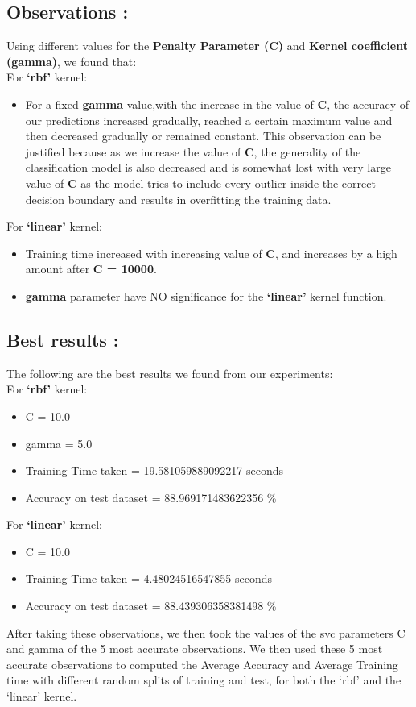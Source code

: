\documentclass{report}
\begin{document}
\subsection{\LARGE Observations :}
Using different values for the \textbf{Penalty Parameter (C)} and \textbf{Kernel coefficient (gamma)}, we found that:\\
\linebreak
\linebreak
{For \textbf{‘rbf’} kernel:}
\setlength{\itemsep}{0cm}
\begin{itemize}
\item For a fixed \textbf{gamma} value,with the increase in the value of \textbf{C}, the accuracy of our predictions increased gradually, reached a certain maximum value and then decreased gradually or remained constant. This observation can be justified because as we increase the value of \textbf{C}, the generality of the classification model is also decreased and is somewhat lost with very large value of \textbf{C} as the model tries to include every outlier inside the correct decision boundary and results in overfitting the training data.

\end{itemize}
For \textbf{‘linear’} kernel:
\begin{itemize}
\item Training time increased with increasing value of \textbf{C}, and increases by a high amount after \textbf{C = 10000}.
\item \textbf{gamma} parameter have NO significance for the \textbf{‘linear’} kernel function.
\end{itemize}
\subsection{\LARGE Best results :}
The following are the best results we found from our experiments:\\
\linebreak
For \textbf{‘rbf’} kernel:
\begin{itemize}
\item C = 10.0
\item gamma = 5.0
\item Training Time taken = 19.581059889092217 seconds
\item Accuracy on test dataset = 88.969171483622356 \%
\end{itemize}
For \textbf{‘linear’} kernel:
\begin{itemize}
\item C = 10.0 
\item Training Time taken = 4.48024516547855 seconds
\item Accuracy on test dataset = 88.439306358381498 \%
\end{itemize}
After taking these observations, we then took the values of the svc parameters C and gamma of the 5 most accurate observations.
We then used these 5 most accurate observations to computed the Average Accuracy and Average Training time with different 
random splits of training and test, for both the ‘rbf’ and the ‘linear’ kernel.
\pagebreak
\end{document}
